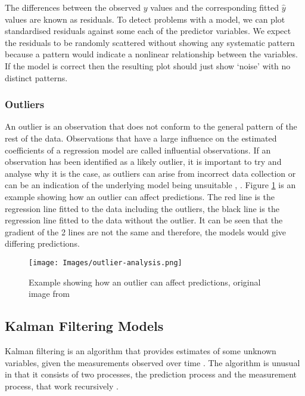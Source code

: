 \documentclass[12pt, a4paper]{article}
\begin{document}
The differences between the observed $y$ values and the corresponding fitted $\hat y$ values are known as residuals. To detect problems with a model, we can plot standardised residuals against some each of the predictor variables. We expect the residuals to be randomly scattered without showing any systematic pattern because a pattern would indicate a nonlinear relationship between the variables. If the model is correct then the resulting plot should just show `noise' with no distinct patterns. 

\subsubsection{Outliers}

An outlier is an observation that does not conform to the general pattern of the rest of the data. Observations that have a large influence on the estimated coefficients of a regression model are called influential observations. If an observation has been identified as a likely outlier, it is important to try and analyse why it is the case, as outliers can arise from incorrect data collection or can be an indication of the underlying model being unsuitable \cite{forecasting-book}, \cite{m2s2-notes}. Figure \ref{fig:outlier} is an example showing how an outlier can affect predictions. The red line is the regression line fitted to the data including the outliers, the black line is the regression line fitted to the data without the outlier. It can be seen that the gradient of the 2 lines are not the same and therefore, the models would give differing predictions.  

\begin{figure}[H]
\begin{center}
    \texttt{[image: Images/outlier-analysis.png]}
    \caption{Example showing how an outlier can affect predictions, original image from \cite{forecasting-book}}
    \label{fig:outlier}
\end{center}
\end{figure}

\subsection{Kalman Filtering Models}
\label{kalman-models}

Kalman filtering is an algorithm that provides estimates of some unknown variables, given the measurements observed over time \cite{kalman-korean}. The algorithm is unusual in that it consists of two processes, the prediction process and the measurement process, that work recursively \cite{kalman-malay}.  \\
\end{document}
